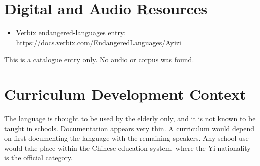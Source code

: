 \documentclass[12pt]{article}
\begin{document}
\section{Digital and Audio Resources}
\begin{itemize}
\item Verbix endangered-languages entry: \url{https://docs.verbix.com/EndangeredLanguages/Ayizi}
\end{itemize}
This is a catalogue entry only. No audio or corpus was found.

\section{Curriculum Development Context}
The language is thought to be used by the elderly only, and it is not known to be taught in schools. Documentation appears very thin. A curriculum would depend on first documenting the language with the remaining speakers. Any school use would take place within the Chinese education system, where the Yi nationality is the official category.
\end{document}
